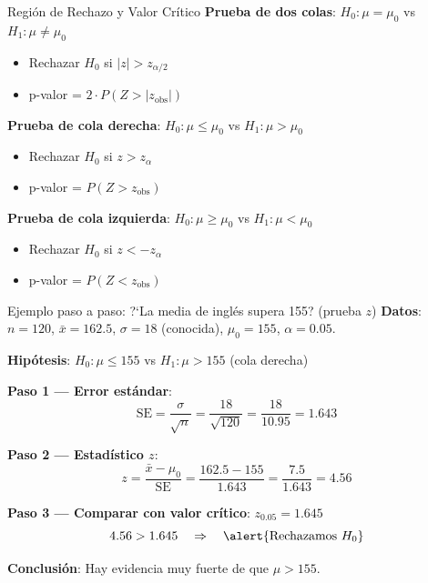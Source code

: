 \documentclass[aspectratio=169, 11pt]{beamer}
\begin{document}
\begin{frame}{Región de Rechazo y Valor Crítico}
\textbf{Prueba de dos colas}: $H_0: \mu = \mu_0$ vs $H_1: \mu \neq \mu_0$
\begin{itemize}
  \item Rechazar $H_0$ si $|z| > z_{\alpha/2}$
  \item p-valor = $2 \cdot P(Z > |z_{\text{obs}}|)$
\end{itemize}

\vspace{0.3cm}
\textbf{Prueba de cola derecha}: $H_0: \mu \leq \mu_0$ vs $H_1: \mu > \mu_0$
\begin{itemize}
  \item Rechazar $H_0$ si $z > z_{\alpha}$
  \item p-valor = $P(Z > z_{\text{obs}})$
\end{itemize}

\vspace{0.3cm}
\textbf{Prueba de cola izquierda}: $H_0: \mu \geq \mu_0$ vs $H_1: \mu < \mu_0$
\begin{itemize}
  \item Rechazar $H_0$ si $z < -z_{\alpha}$
  \item p-valor = $P(Z < z_{\text{obs}})$
\end{itemize}
\end{frame}

\begin{frame}{Ejemplo paso a paso: ?`La media de ingl\'es supera 155? (prueba $z$)}
\small
\textbf{Datos}: $n = 120$, $\bar{x} = 162.5$, $\sigma = 18$ (conocida), $\mu_0 = 155$, $\alpha = 0.05$.

\textbf{Hip\'otesis}: $H_0: \mu \leq 155$ \quad vs \quad $H_1: \mu > 155$ (cola derecha)

\vspace{0.2cm}
\textbf{Paso 1 --- Error est\'andar}:
\[
\text{SE} = \frac{\sigma}{\sqrt{n}} = \frac{18}{\sqrt{120}} = \frac{18}{10.95} = 1.643
\]

\textbf{Paso 2 --- Estad\'istico $z$}:
\[
z = \frac{\bar{x} - \mu_0}{\text{SE}} = \frac{162.5 - 155}{1.643} = \frac{7.5}{1.643} = 4.56
\]

\textbf{Paso 3 --- Comparar con valor cr\'itico}: $z_{0.05} = 1.645$
\[
4.56 > 1.645 \quad \Rightarrow \quad \alert{\text{Rechazamos } H_0}
\]

\textbf{Conclusi\'on}: Hay evidencia muy fuerte de que $\mu > 155$.
\end{frame}
\end{document}
